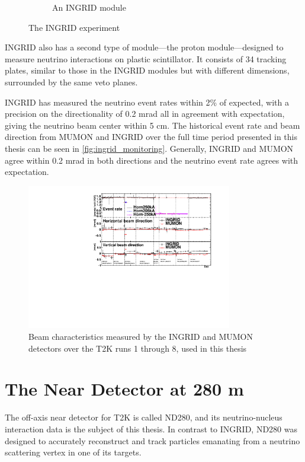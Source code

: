 \begin{figure}[h]
\begin{subfigure}[t]{0.47\textwidth}
		\caption{An INGRID module}
	\end{subfigure}
	\caption{The INGRID experiment}
	\label{fig:ingrid_det}
\end{figure}
INGRID also has a second type of module---the proton module\cite{t2k_ingrid_proton}---designed to measure neutrino interactions on plastic scintillator. It consists of 34 tracking plates, similar to those in the INGRID modules but with different dimensions, surrounded by the same veto planes.

INGRID has measured the neutrino event rates within 2\% of expected, with a precision on the directionality of 0.2 mrad all in agreement with expectation\cite{t2k_2015}, giving the neutrino beam center within 5 cm. The historical event rate and beam direction from MUMON and INGRID over the full time period presented in this thesis can be seen in \autoref{fig:ingrid_monitoring}. Generally, INGRID and MUMON agree within 0.2 mrad in both directions and the neutrino event rate agrees with expectation.
\begin{figure}[h]
	\includegraphics[width=0.8\textwidth, trim={0mm 0mm 0mm 0mm}, clip,page=1]{figures/det_chap/ingrid/INGRID_official_plot_until74}
	\caption{Beam characteristics measured by the INGRID and MUMON detectors over the T2K runs 1 through 8, used in this thesis}
	\label{fig:ingrid_monitoring}
\end{figure}

\section{The Near Detector at 280 m}
\label{sec:nd280}
The off-axis near detector for T2K is called ND280, and its neutrino-nucleus interaction data is the subject of this thesis. In contrast to INGRID, ND280 was designed to accurately reconstruct and track particles emanating from a neutrino scattering vertex in one of its targets. 

